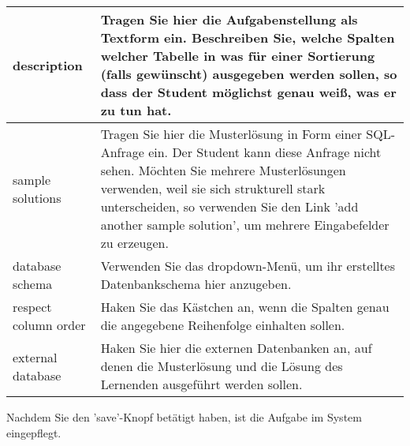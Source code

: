 \begin{tabular}{|l|p{12cm}|}\hline
description & Tragen Sie hier die Aufgabenstellung als Textform ein. Beschreiben Sie, welche Spalten welcher Tabelle in was für einer Sortierung (falls gewünscht) ausgegeben werden sollen, so dass der Student möglichst genau weiß, was er zu tun hat.\\\hline
sample solutions & Tragen Sie hier die Musterlösung in Form einer SQL-Anfrage ein. Der Student kann diese Anfrage nicht sehen. Möchten Sie mehrere Musterlösungen verwenden, weil sie sich strukturell stark unterscheiden, so verwenden Sie den Link 'add another sample solution', um mehrere Eingabefelder zu erzeugen.\\\hline
database schema & Verwenden Sie das dropdown-Menü, um ihr erstelltes Datenbankschema hier anzugeben.\\\hline
respect column order & Haken Sie das Kästchen an, wenn die Spalten genau die angegebene Reihenfolge einhalten sollen.\\\hline
external database & Haken Sie hier die externen Datenbanken an, auf denen die Musterlösung und die Lösung des Lernenden ausgeführt werden sollen.\\\hline
\end{tabular}

Nachdem Sie den 'save'-Knopf betätigt haben, ist die Aufgabe im System eingepflegt.